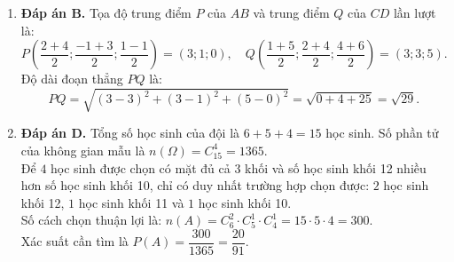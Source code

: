 \documentclass[12pt,a4paper]{article}
\begin{document}
\begin{enumerate}[label=\textbf{Câu \arabic*:}, leftmargin=*]
\item \textbf{Đáp án B.}
Tọa độ trung điểm $P$ của $AB$ và trung điểm $Q$ của $CD$ lần lượt là:
$$P\left(\dfrac{2+4}{2}; \dfrac{-1+3}{2}; \dfrac{1-1}{2}\right) = (3; 1; 0), \quad Q\left(\dfrac{1+5}{2}; \dfrac{2+4}{2}; \dfrac{4+6}{2}\right) = (3; 3; 5).$$
Độ dài đoạn thẳng $PQ$ là:
$$PQ = \sqrt{(3 - 3)^2 + (3 - 1)^2 + (5 - 0)^2} = \sqrt{0 + 4 + 25} = \sqrt{29}.$$

\item \textbf{Đáp án D.}
Tổng số học sinh của đội là $6 + 5 + 4 = 15$ học sinh. Số phần tử của không gian mẫu là $n(\Omega) = C_{15}^4 = 1365$.\\
Để $4$ học sinh được chọn có mặt đủ cả $3$ khối và số học sinh khối 12 nhiều hơn số học sinh khối 10, chỉ có duy nhất trường hợp chọn được: $2$ học sinh khối 12, $1$ học sinh khối 11 và $1$ học sinh khối 10.\\
Số cách chọn thuận lợi là: $n(A) = C_6^2 \cdot C_5^1 \cdot C_4^1 = 15 \cdot 5 \cdot 4 = 300$.\\
Xác suất cần tìm là $P(A) = \dfrac{300}{1365} = \dfrac{20}{91}$.

\end{enumerate}
\end{document}
